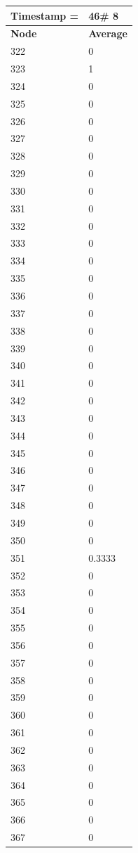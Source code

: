 \begin{tabular}{|l||l|}
\hline
\textbf{Timestamp =} & \textbf{46}\# 8\\\hline
	\textbf{Node} & \textbf{Average} \\ \hline
\hline
	322 & 0 \\ \hline
	323 & 1 \\ \hline
	324 & 0 \\ \hline
	325 & 0 \\ \hline
	326 & 0 \\ \hline
	327 & 0 \\ \hline
	328 & 0 \\ \hline
	329 & 0 \\ \hline
	330 & 0 \\ \hline
	331 & 0 \\ \hline
	332 & 0 \\ \hline
	333 & 0 \\ \hline
	334 & 0 \\ \hline
	335 & 0 \\ \hline
	336 & 0 \\ \hline
	337 & 0 \\ \hline
	338 & 0 \\ \hline
	339 & 0 \\ \hline
	340 & 0 \\ \hline
	341 & 0 \\ \hline
	342 & 0 \\ \hline
	343 & 0 \\ \hline
	344 & 0 \\ \hline
	345 & 0 \\ \hline
	346 & 0 \\ \hline
	347 & 0 \\ \hline
	348 & 0 \\ \hline
	349 & 0 \\ \hline
	350 & 0 \\ \hline
	351 & 0.3333 \\ \hline
	352 & 0 \\ \hline
	353 & 0 \\ \hline
	354 & 0 \\ \hline
	355 & 0 \\ \hline
	356 & 0 \\ \hline
	357 & 0 \\ \hline
	358 & 0 \\ \hline
	359 & 0 \\ \hline
	360 & 0 \\ \hline
	361 & 0 \\ \hline
	362 & 0 \\ \hline
	363 & 0 \\ \hline
	364 & 0 \\ \hline
	365 & 0 \\ \hline
	366 & 0 \\ \hline
	367 & 0 \\ \hline
\end{tabular}
